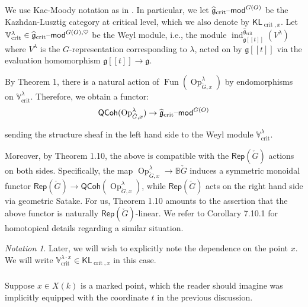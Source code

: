 \documentclass[reqno,11pt]{amsart}
\numberwithin{equation}{subsection}
\theoremstyle{remark}
\newtheorem{notation}[thm]{Notation}
\newcommand{\bB}{{\mathbb B}}
\newcommand{\bV}{{\mathbb V}}
\newcommand{\fg}{{\mathfrak g}}
\newcommand{\on}{\operatorname}
\newcommand{\mathendash}{\text{\textendash}}
\newcommand{\ind}{\on{ind}}
\newcommand{\Rep}{\mathsf{Rep}}
\newcommand{\Fun}{\on{Fun}}
\newcommand{\Op}{\on{Op}}
\renewcommand{\mod}{\mathendash\mathsf{mod}}
\newcommand{\QCoh}{\mathsf{QCoh}}
\newcommand{\crit}{\on{crit}}
\newcommand{\KL}{\mathsf{KL}}
\begin{document}
\subsubsection{}

We use Kac-Moody notation as in \cite{localization}.
In particular, we let 
$\widehat{\fg}_{\crit}\mod^{G(O)}$ be the Kazhdan-Lusztig category at
critical level, which we also denote by $\KL_{\crit,x}$.
Let $\bV_{\crit}^{\lambda} \in \widehat{\fg}_{\crit}\mod^{G(O),\heartsuit}$ be
the Weyl module, i.e., the module $\ind_{\fg[[t]]}^{\widehat{\fg}_{\crit}}(V^{\lambda})$
where $V^{\lambda}$ is the $G$-representation corresponding
to $\lambda$, acted on by $\fg[[t]]$ via the evaluation homomorphism $\fg[[t]] \to \fg$. 

By \cite{fg-weyl} Theorem 1, there is a natural action of
$\Fun(\Op_{\check{G},x}^{\lambda})$ by endomorphisms on $\bV_{\crit}^{\lambda}$.
Therefore, we obtain a functor:
%
\begin{equation}\label{eq:weyl-x}
\QCoh(\Op_{\check{G},x}^{\lambda}) \to \widehat{\fg}_{\crit}\mod^{G(O)}
\end{equation}

\noindent sending the structure sheaf in the left hand side to the Weyl module
$\bV_{\crit}^{\lambda}$.

Moreover, by \cite{fg-fusion} Theorem 1.10,
the above is compatible with the $\Rep(\check{G})$ actions on both 
sides. Specifically, the map $\Op_{\check{G},x}^{\lambda} \to \bB \check{G}$
induces a symmetric monoidal functor $\Rep(\check{G}) \to 
\QCoh(\Op_{\check{G},x}^{\lambda})$, while $\Rep(\check{G})$ acts on the
right hand side via geometric Satake. For us, \cite{fg-fusion} Theorem 1.10
amounts to the assertion that the above functor is 
naturally $\Rep(\check{G})$-linear. We refer to \cite{localization} 
Corollary 7.10.1 for homotopical details regarding a similar situation.

\begin{notation}

Later, we will wish to explicitly note the dependence on the point $x$.
We will write $\bV_{\crit}^{\lambda\cdot x} \in \KL_{\crit,x}$
in this case.

\end{notation}

\subsubsection{}

Suppose $x \in X(k)$ is a marked point, which the reader should imagine
was implicitly equipped with the coordinate $t$ in the previous discussion.
\end{document}
